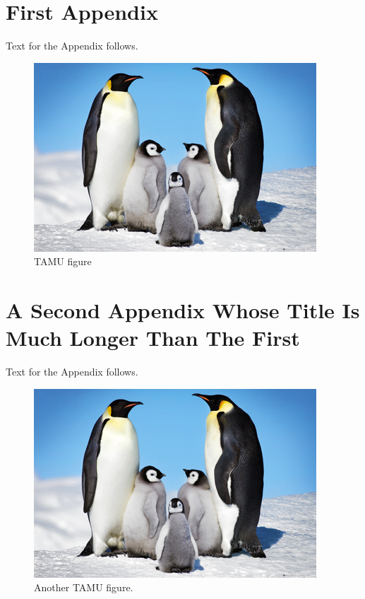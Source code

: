 %
%
%
%





\chapter*{First Appendix}

Text for the Appendix follows.

\begin{figure}[h]
\centering
\includegraphics[scale=.50]{graphic/Penguins.jpg}
\caption{TAMU figure}
\label{fig:tamu-fig5}
\end{figure}

\chapter*{A Second Appendix Whose Title Is Much Longer Than The First}

Text for the Appendix follows.

\begin{figure}[h]
\centering
\includegraphics[scale=.50]{graphic/Penguins.jpg}
\caption{Another TAMU figure.}
\label{fig:tamu-fig6}
\end{figure}


\pagebreak{}
